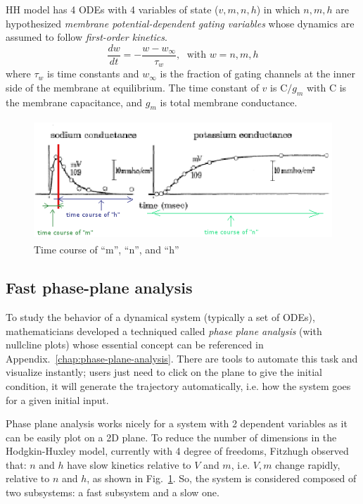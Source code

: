 HH model has 4 ODEs with 4 variables of state
($v,m,n,h$) in which $n, m, h$ are hypothesized
{\it membrane potential-dependent gating variables} whose dynamics are
assumed to follow {\it first-order kinetics}.
\begin{equation}
  \label{eq:285}
  \frac{dw}{dt} = -\frac{w-w_\infty}{\tau_w}, \; \text{ with }w=n, m, h
\end{equation}
where $\tau_w$ is time constants and $w_\infty$ is the fraction of gating
channels at the inner side of the membrane at equilibrium. The time constant of
$v$ is C$/g_m$ with C is the membrane capacitance, and $g_m$ is total membrane
conductance. 


\begin{figure}[hbt]
  \centerline{\includegraphics[height=4.5cm,
    angle=0]{./images/time_course.eps}}
  \caption{Time course of ``m'', ``n'', and ``h''}
  \label{fig:time_course}
\end{figure}


\subsection{Fast phase-plane analysis}
\label{sec:quant-analys}

To study the behavior of a dynamical system (typically a set of ODEs),
mathematicians developed a techniqued called {\it phase plane analysis}
(with nullcline plots) whose essential concept can be referenced in
Appendix.~\ref{chap:phase-plane-analysis}.
There are tools to automate this task and visualize instantly; users just need
to click on the plane to give the initial condition, it will generate the
trajectory automatically, i.e. how the system goes for a given initial input. 

Phase plane analysis works nicely for a system with 2 dependent variables as it
can be easily plot on a 2D plane. To reduce the number of dimensions in the
Hodgkin-Huxley model, currently with 4 degree of freedoms, Fitzhugh observed
that: $n$ and $h$ have slow kinetics relative to $V$ and $m$, i.e.
$V,m$ change rapidly, relative to $n$ and $h$, as shown in
Fig.~\ref{fig:time_course}. So, the system is considered composed of two
subsystems: a fast subsystem and a slow one. 

